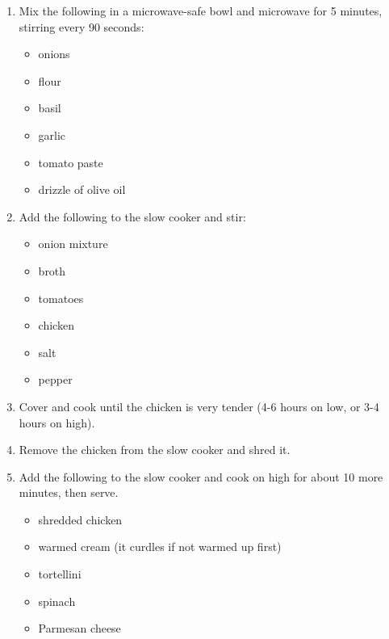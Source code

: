 \begin{enumerate}
\item Mix the following in a microwave-safe bowl and microwave for 5 minutes, stirring every 90 seconds:
\begin{itemize}
    \item onions
    \item flour
    \item basil
    \item garlic
    \item tomato paste
    \item drizzle of olive oil
\end{itemize}
\item Add the following to the slow cooker and stir:
\begin{itemize}
    \item onion mixture
    \item broth
    \item tomatoes
    \item chicken
    \item salt
    \item pepper
\end{itemize}
\item Cover and cook until the chicken is very tender (4-6 hours on low, or 3-4 hours on high).
\item Remove the chicken from the slow cooker and shred it.
\item Add the following to the slow cooker and cook on high for about 10 more minutes, then serve.
\begin{itemize}
    \item shredded chicken
    \item warmed cream (it curdles if not warmed up first)
    \item tortellini
    \item spinach
    \item Parmesan cheese
\end{itemize}
\end{enumerate}
